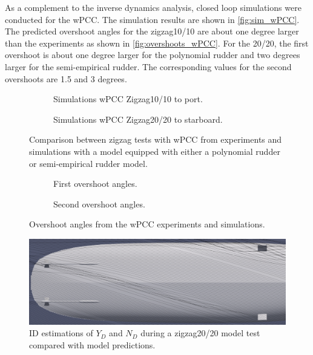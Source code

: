 As a complement to the inverse dynamics analysis, closed loop simulations were conducted for the wPCC. The simulation results are shown in \autoref{fig:sim_wPCC}. The predicted overshoot angles for the zigzag10/10 are about one degree larger than the experiments as shown in \autoref{fig:overshoots_wPCC}. For the 20/20, the first overshoot is about one degree larger for the polynomial rudder and two degrees larger for the semi-empirical rudder. The corresponding values for the second overshoots are 1.5 and 3 degrees.       

\begin{figure}[h]
     \centering
     \begin{subfigure}[b]{\textwidth}
         \centering
         
        \caption{Simulations wPCC Zigzag10/10 to port.}
        \label{fig:sim_wPCC_10}
     \end{subfigure}
     \vfill
     \begin{subfigure}[b]{\textwidth}
        \centering
        
        \caption{Simulations wPCC Zigzag20/20 to starboard.}
        \label{fig:sim_wPCC_20}
     \end{subfigure}
        \caption{Comparison between zigzag tests with wPCC from experiments and simulations with a model equipped with either a polynomial rudder or semi-empirical rudder model.}
        \label{fig:sim_wPCC}
\end{figure}

\begin{figure}[h]
     \centering
     \begin{subfigure}[b]{\textwidth}
         \centering
         
        \caption{First overshoot angles.}
        \label{fig:overhoots1_wPCC}
     \end{subfigure}
     \vfill
     \begin{subfigure}[b]{\textwidth}
         \centering
         
        \caption{Second overshoot angles.}
        \label{fig:overhoots2_wPCC}
     \end{subfigure}
     
        \caption{Overshoot angles from the wPCC experiments and simulations.}
        \label{fig:overshoots_wPCC}
\end{figure}

\begin{figure}[h]
    \centering
    \includegraphics{figures/paraview_drift_15.png}
    \caption{ID estimations of $Y_D$ and $N_D$ during a zigzag20/20 model test compared with model predictions.}
    \label{fig:ID_zigzag20}
\end{figure}